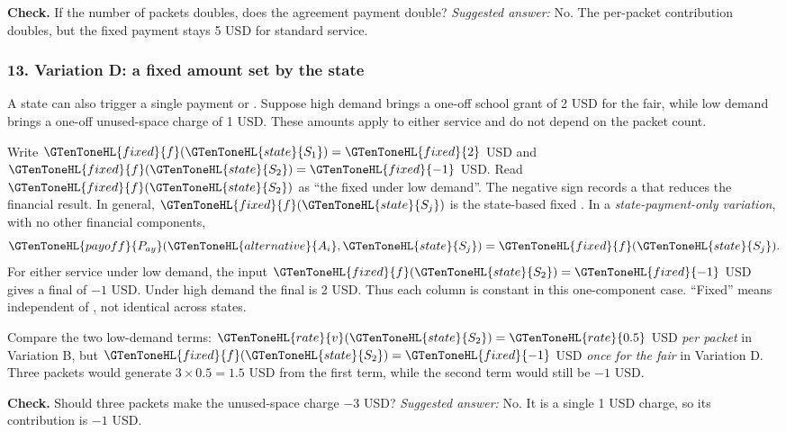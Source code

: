 \textbf{Check.} If the number of packets doubles, does the agreement payment double? \emph{Suggested answer:} No. The per-packet contribution doubles, but the fixed payment stays 5 USD for standard service.

\subsubsection*{13. Variation D: a fixed amount set by the state}
A state can also trigger a single payment or . Suppose high demand brings a one-off school grant of 2 USD for the fair, while low demand brings a one-off unused-space charge of 1 USD. These amounts apply to either service and do not depend on the packet count.

Write $\GTenToneHL{fixed}{f}(\GTenToneHL{state}{S_1})=\GTenToneHL{fixed}{2}$ USD and $\GTenToneHL{fixed}{f}(\GTenToneHL{state}{S_2})=\GTenToneHL{fixed}{-1}$ USD. Read $\GTenToneHL{fixed}{f}(\GTenToneHL{state}{S_2})$ as ``the fixed  under low demand''. The negative sign records a  that reduces the financial result. In general, $\GTenToneHL{fixed}{f}(\GTenToneHL{state}{S_j})$ is the state-based fixed . In a \emph{state-payment-only variation}, with no other financial components,
\[\GTenToneHL{payoff}{P_{ay}}(\GTenToneHL{alternative}{A_i},\GTenToneHL{state}{S_j})=\GTenToneHL{fixed}{f}(\GTenToneHL{state}{S_j}).\]
For either service under low demand, the input $\GTenToneHL{fixed}{f}(\GTenToneHL{state}{S_2})=\GTenToneHL{fixed}{-1}$ USD gives a final  of $-1$ USD. Under high demand the final  is 2 USD. Thus each column is constant in this one-component case. ``Fixed'' means independent of , not identical across states.

Compare the two low-demand terms: $\GTenToneHL{rate}{v}(\GTenToneHL{state}{S_2})=\GTenToneHL{rate}{0.5}$ USD \emph{per packet} in Variation B, but $\GTenToneHL{fixed}{f}(\GTenToneHL{state}{S_2})=\GTenToneHL{fixed}{-1}$ USD \emph{once for the fair} in Variation D. Three packets would generate $3\times0.5=1.5$ USD from the first term, while the second term would still be $-1$ USD.

\textbf{Check.} Should three packets make the unused-space charge $-3$ USD? \emph{Suggested answer:} No. It is a single 1 USD charge, so its contribution is $-1$ USD.

